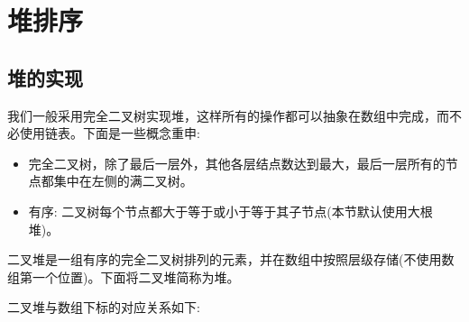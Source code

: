 \section{堆排序}

\subsection{堆的实现}

我们一般采用完全二叉树实现堆，这样所有的操作都可以抽象在数组中完成，而不必使用链表。下面是一些概念重申:

\begin{itemize}
  \item 完全二叉树，除了最后一层外，其他各层结点数达到最大，最后一层所有的节点都集中在左侧的满二叉树。
  \item 有序: 二叉树每个节点都大于等于或小于等于其子节点(本节默认使用大根堆)。
\end{itemize}

二叉堆是一组有序的完全二叉树排列的元素，并在数组中按照层级存储(不使用数组第一个位置)。下面将二叉堆简称为堆。

二叉堆与数组下标的对应关系如下:

